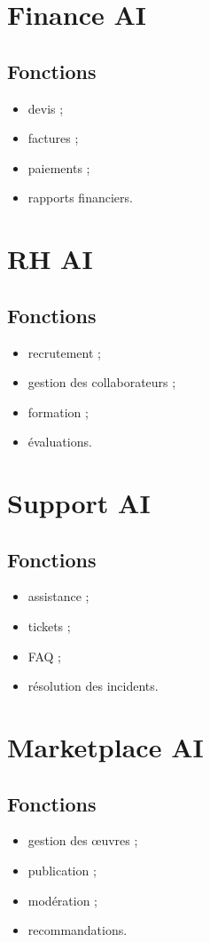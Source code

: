\documentclass[12pt,a4paper,oneside]{book}
\begin{document}
\section{Finance AI}
\subsection{Fonctions}
\begin{itemize}
\item devis ;
\item factures ;
\item paiements ;
\item rapports financiers.
\end{itemize}

\section{RH AI}
\subsection{Fonctions}
\begin{itemize}
\item recrutement ;
\item gestion des collaborateurs ;
\item formation ;
\item évaluations.
\end{itemize}

\section{Support AI}
\subsection{Fonctions}
\begin{itemize}
\item assistance ;
\item tickets ;
\item FAQ ;
\item résolution des incidents.
\end{itemize}

\section{Marketplace AI}
\subsection{Fonctions}
\begin{itemize}
\item gestion des œuvres ;
\item publication ;
\item modération ;
\item recommandations.
\end{itemize}
\end{document}
